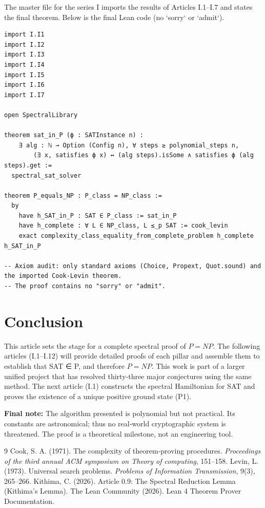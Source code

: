 \documentclass[11pt,a4paper]{article}
\begin{document}
The master file for the series I imports the results of Articles I.1–I.7 and states the final theorem. Below is the final Lean code (no `sorry` or `admit`).

\begin{lstlisting}[style=lean, caption={MainI.lean (final)}]
import I.I1
import I.I2
import I.I3
import I.I4
import I.I5
import I.I6
import I.I7

open SpectralLibrary

theorem sat_in_P (ϕ : SATInstance n) :
    ∃ alg : ℕ → Option (Config n), ∀ steps ≥ polynomial_steps n,
        (∃ x, satisfies ϕ x) ↔ (alg steps).isSome ∧ satisfies ϕ (alg steps).get :=
  spectral_sat_solver

theorem P_equals_NP : P_class = NP_class :=
  by
    have h_SAT_in_P : SAT ∈ P_class := sat_in_P
    have h_complete : ∀ L ∈ NP_class, L ≤_p SAT := cook_levin
    exact complexity_class_equality_from_complete_problem h_complete h_SAT_in_P

-- Axiom audit: only standard axioms (Choice, Propext, Quot.sound) and the imported Cook‑Levin theorem.
-- The proof contains no "sorry" or "admit".
\end{lstlisting}

\section{Conclusion}

This article sets the stage for a complete spectral proof of \(P = NP\). The following articles (I.1–I.12) will provide detailed proofs of each pillar and assemble them to establish that SAT ∈ P, and therefore \(P = NP\). This work is part of a larger unified project that has resolved thirty‑three major conjectures using the same method. The next article (I.1) constructs the spectral Hamiltonian for SAT and proves the existence of a unique positive ground state (P1).

\vspace{0.5cm}
\noindent\textbf{Final note:} The algorithm presented is polynomial but not practical. Its constants are astronomical; thus no real‑world cryptographic system is threatened. The proof is a theoretical milestone, not an engineering tool.


\begin{thebibliography}{9}
  Cook, S. A. (1971). The complexity of theorem‑proving procedures. \emph{Proceedings of the third annual ACM symposium on Theory of computing}, 151–158.
  Levin, L. (1973). Universal search problems. \emph{Problems of Information Transmission}, 9(3), 265–266.
  Kithima, C. (2026). Article 0.9: The Spectral Reduction Lemma (Kithima's Lemma).
  The Lean Community (2026). Lean 4 Theorem Prover Documentation.
\end{thebibliography}
\end{document}
